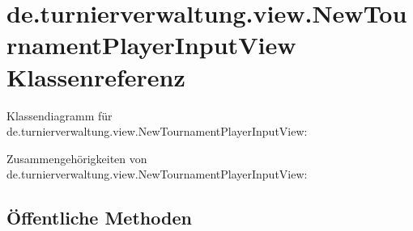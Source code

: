 \hypertarget{classde_1_1turnierverwaltung_1_1view_1_1_new_tournament_player_input_view}{}\section{de.\+turnierverwaltung.\+view.\+New\+Tournament\+Player\+Input\+View Klassenreferenz}
\label{classde_1_1turnierverwaltung_1_1view_1_1_new_tournament_player_input_view}


Klassendiagramm für de.\+turnierverwaltung.\+view.\+New\+Tournament\+Player\+Input\+View\+:


Zusammengehörigkeiten von de.\+turnierverwaltung.\+view.\+New\+Tournament\+Player\+Input\+View\+:
\subsection*{Öffentliche Methoden}
